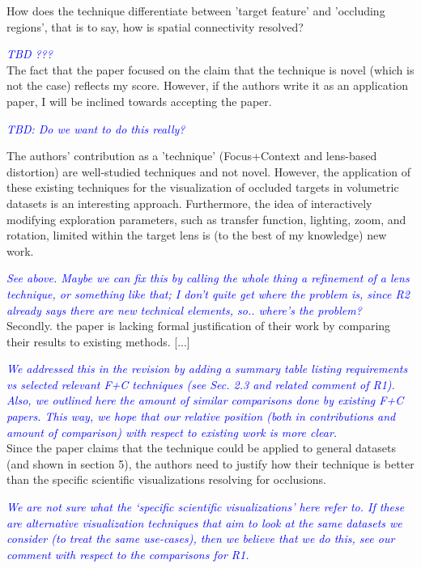\documentclass[a4paper,10pt]{article}
\newcommand{\rr}[1]{\emph{\textcolor{blue}{#1}}}
\begin{document}
    How does the technique
    differentiate between 'target feature' and 'occluding regions', that is to say,
    how is spatial connectivity resolved?
    
    \rr{TBD ???}\\

    The fact that the paper focused on the claim that the technique is novel (which is
    not the case) reflects my score. However, if the authors write it as an
    application paper, I will be inclined towards accepting the paper.
    
    \rr{TBD: Do we want to do this really?}

    The authors' contribution as a 'technique' (Focus+Context and lens-based
    distortion) are well-studied techniques and not novel. However, the application of
    these existing techniques for the visualization of occluded targets in volumetric
    datasets is an interesting approach. Furthermore, the idea of interactively
    modifying exploration parameters, such as transfer function, lighting, zoom, and
    rotation, limited within the target lens is (to the best of my knowledge) new
    work.
    
    \rr{See above. Maybe we can fix this by calling the whole thing a refinement of a lens technique, or something like that; I don't quite get where the problem is, since R2 already says there are new technical elements, so.. where's the problem?}\\

    Secondly. the paper is lacking formal justification of their work by comparing
    their results to existing methods. [...]
    
    \rr{We addressed this in the revision by adding a summary table listing requirements \emph{vs} selected relevant F+C techniques (see Sec. 2.3 and related comment of R1). Also, we outlined here the amount of similar comparisons done by existing F+C papers. This way, we hope that our relative position (both in contributions and amount of comparison) with respect to existing work is more clear.}\\
    
    Since the paper claims that the technique could be applied to
    general datasets (and shown in section 5), the authors need to justify how their
    technique is better than the specific scientific visualizations resolving for
    occlusions.
    
    \rr{We are not sure what the `specific scientific visualizations' here refer to. If these are alternative visualization techniques that aim to look at the same datasets we consider (to treat the same use-cases), then we believe that we do this, see our comment with respect to the comparisons for R1.}\\
    
\end{document}
